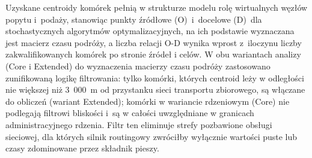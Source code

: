\documentclass{pracamgr}
\begin{document}
Uzyskane centroidy komórek pełnią w strukturze modelu rolę wirtualnych węzłów popytu i~podaży, stanowiąc punkty źródłowe (O)~i~docelowe (D)~dla stochastycznych algorytmów optymalizacyjnych, na ich podstawie wyznaczana jest macierz czasu podróży, a liczba relacji \mbox{O-D} wynika wprost z~iloczynu liczby zakwalifikowanych komórek po stronie źródeł i celów. W obu wariantach analizy (Core i Extended) do wyznaczenia macierzy czasu podróży zastosowano zunifikowaną logikę filtrowania: tylko komórki, których centroid leży w odległości nie większej niż 3~000~m od przystanku sieci transportu zbiorowego, są włączane do obliczeń (wariant Extended); komórki w wariancie rdzeniowym (Core) nie podlegają filtrowi bliskości i~są w całości uwzględniane w granicach administracyjnego rdzenia. Filtr ten eliminuje strefy pozbawione obsługi sieciowej, dla których silnik routingowy zwróciłby wyłącznie wartości puste lub czasy zdominowane przez składnik pieszy.
\end{document}
